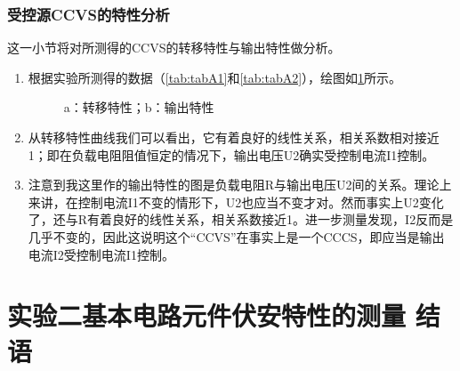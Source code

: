 \documentclass[dvipsnames, svgnames,a4paper,11pt]{article}
\begin{document}
	
	\subsubsection{受控源CCVS的特性分析}
	这一小节将对所测得的CCVS的转移特性与输出特性做分析。
	\begin{enumerate}
		\item 根据实验所测得的数据（\cref{tab:tabA1}和\cref{tab:tabA2}），绘图如\cref{fig:figA1}所示。
		
		\begin{figure}[htbp]
			\centering
			\caption{a：转移特性；b：输出特性}
			\label{fig:figA1}			
		\end{figure}
		
		\item 从转移特性曲线我们可以看出，它有着良好的线性关系，相关系数相对接近1；即在负载电阻阻值恒定的情况下，输出电压U2确实受控制电流I1控制。
		
		\item 注意到我这里作的输出特性的图是负载电阻R与输出电压U2间的关系。理论上来讲，在控制电流I1不变的情形下，U2也应当不变才对。然而事实上U2变化了，还与R有着良好的线性关系，相关系数接近1。进一步测量发现，I2反而是几乎不变的，因此这说明这个“CCVS”在事实上是一个CCCS，即应当是输出电流I2受控制电流I1控制。
		
	\end{enumerate}
	
	
	
	
	
	
	\clearpage
	
	\section{实验二\quad 基本电路元件伏安特性的测量 \quad\heiti 结语}
	
\end{document}
